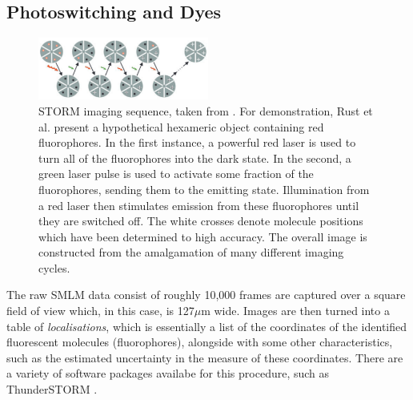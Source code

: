 \documentclass[11pt]{article}
\begin{document}
\subsection{Photoswitching and Dyes}
\begin{figure}[h!] 
	\centering
	\includegraphics[width=0.5\textwidth]{figs/photoswitchStorm.png}
	\caption{STORM imaging sequence, taken from \cite{rust2006sub}. For demonstration, Rust et al. present a hypothetical hexameric object containing red fluorophores. In the first instance, a powerful red laser is used to turn all of the fluorophores into the dark state. In the second, a green laser pulse is used to activate some fraction of the fluorophores, sending them to the emitting state. Illumination from a red laser then stimulates emission from these fluorophores until they are switched off. The white crosses denote molecule positions which have been determined to high accuracy. The overall image is constructed from the amalgamation of many different imaging cycles.}
	\label{photoswitchStorm}
\end{figure}

The raw SMLM data consist of roughly 10,000 frames are captured over a square field of view which, in this case, is 127$\mu$m wide. Images are then turned into a table of \textit{localisations}, which is essentially a list of the coordinates of the identified fluorescent molecules (fluorophores), alongside with some other characteristics, such as the estimated uncertainty in the measure of these coordinates. There are a variety of software packages availabe for this procedure, such as ThunderSTORM \cite{thunderstorm}.
\end{document}
